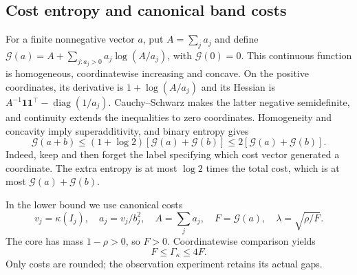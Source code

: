 \subsection{Cost entropy and canonical band costs}\label{sec:entropy-preliminaries}
For a finite nonnegative vector $a$, put $A=\sum_j a_j$ and define
$\mathcal G(a)=A+\sum_{j:a_j>0}a_j\log(A/a_j)$, with
$\mathcal G(0)=0$. This continuous function is homogeneous,
coordinatewise increasing and concave. On the positive coordinates,
its derivative is $1+\log(A/a_j)$ and its Hessian is
$A^{-1}\mathbf1\mathbf1^\top-\operatorname{diag}(1/a_j)$.
Cauchy--Schwarz makes the latter negative semidefinite, and continuity
extends the inequalities to zero coordinates. Homogeneity and concavity
imply superadditivity, and binary entropy gives
\begin{equation}\label{eq:binary-mixture}
 \mathcal G(a+b)\le(1+\log2)[\mathcal G(a)+\mathcal G(b)]
                 \le2[\mathcal G(a)+\mathcal G(b)].
\end{equation}
Indeed, keep and then forget the label specifying which cost vector
generated a coordinate. The extra entropy is at most $\log2$ times
the total cost, which is at most $\mathcal G(a)+\mathcal G(b)$.

In the lower bound we use canonical costs
\[
 v_j=\kappa(I_j),\quad a_j=v_j/b_j^2,\quad A=\sum_j a_j,
 \quad F=\mathcal G(a),\quad \lambda=\sqrt{\rho/F}.
\]
The core has mass $1-\rho>0$, so $F>0$. Coordinatewise comparison yields
\begin{equation}\label{eq:canonical-core}
                      F\le\Gamma_\kappa\le4F.
\end{equation}
Only costs are rounded; the observation experiment retains its actual gaps.
